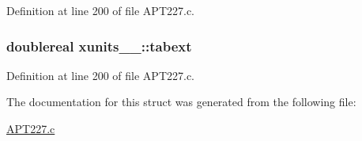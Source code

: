 Definition at line 200 of file A\+P\+T227.\+c.

\subsubsection[{\texorpdfstring{tabext}{tabext}}]{\setlength{\rightskip}{0pt plus 5cm}doublereal xunits\+\_\+\_\+\+::tabext}\hypertarget{structxunits__1___ae1da3fd895454b4eafbd24cfbb3e42ba}{}\label{structxunits__1___ae1da3fd895454b4eafbd24cfbb3e42ba}


Definition at line 200 of file A\+P\+T227.\+c.



The documentation for this struct was generated from the following file\+:\begin{DoxyCompactItemize}
\item 
\hyperlink{APT227_8c}{A\+P\+T227.\+c}\end{DoxyCompactItemize}
